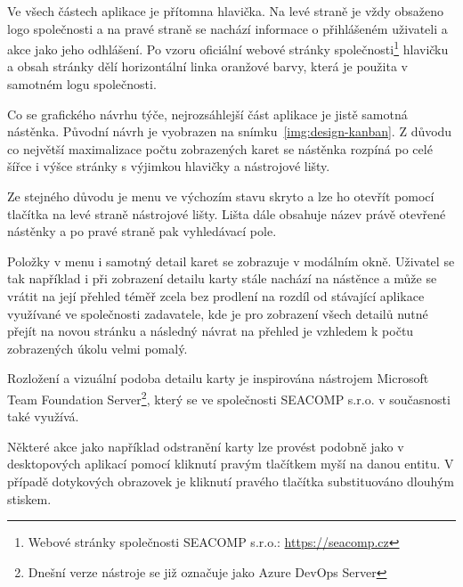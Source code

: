 Ve všech částech aplikace je přítomna hlavička. Na levé straně je vždy obsaženo logo společnosti a na pravé straně se nachází informace o přihlášeném uživateli a akce jako jeho odhlášení. Po vzoru oficiální webové stránky společnosti\footnote{Webové stránky společnosti SEACOMP s.r.o.: \url{https://seacomp.cz}} hlavičku a obsah stránky dělí horizontální linka oranžové barvy, která je použita v samotném logu společnosti.

Co se grafického návrhu týče, nejrozsáhlejší část aplikace je jistě samotná nástěnka. Původní návrh je vyobrazen na snímku~\ref{img:design-kanban}. Z důvodu co největší maximalizace počtu zobrazených karet se nástěnka rozpíná po celé šířce i výšce stránky s výjimkou hlavičky a nástrojové lišty.

Ze stejného důvodu je menu ve výchozím stavu skryto a lze ho otevřít pomocí tlačítka na levé straně nástrojové lišty. Lišta dále obsahuje název právě otevřené nástěnky a po pravé straně pak vyhledávací pole.

Položky v menu i samotný detail karet se zobrazuje v modálním okně. Uživatel se tak například i při zobrazení detailu karty stále nachází na nástěnce a může se vrátit na její přehled téměř zcela bez prodlení na rozdíl od stávající aplikace využívané ve společnosti zadavatele, kde je pro zobrazení všech detailů nutné přejít na novou stránku a následný návrat na přehled je vzhledem k počtu zobrazených úkolu velmi pomalý.

Rozložení a vizuální podoba detailu karty je inspirována nástrojem Microsoft Team Foundation Server\footnote{Dnešní verze nástroje se již označuje jako Azure DevOps Server}, který se ve společnosti SEACOMP s.r.o. v současnosti také využívá.

Některé akce jako například odstranění karty lze provést podobně jako v desktopových aplikací pomocí kliknutí pravým tlačítkem myší na danou entitu. V případě dotykových obrazovek je kliknutí pravého tlačítka substituováno dlouhým stiskem. 

